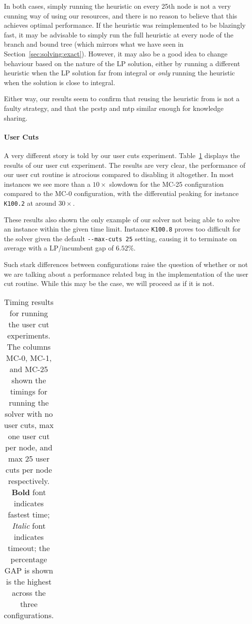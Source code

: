 In both cases, simply running the heuristic on every 25th node is not a very cunning
way of using our resources, and there is no reason to believe that this achieves optimal
performance. If the heuristic was reimplemented to be blazingly fast, it may be advisable to
simply run the full heuristic at every node of the branch and bound tree
(which mirrors what we have seen in Section~\ref{sec:solving:exact}). However, it may also
be a good idea to change behaviour based on the nature of the LP solution, either by
running a different heuristic when the LP solution far from integral or \textit{only}
running the heuristic when the solution is close to integral. 

Either way, our results seem to confirm that reusing the heuristic from
\citeauthor{ljubic2005solving} is not a faulty strategy, and that the \gls{pcstp}
and \gls{mtp} similar enough for knowledge sharing.

\paragraph{User Cuts}
A very different story is told by our user cuts experiment. Table~\ref{tab:jmp:maxcut}
displays the results of our user cut experiment. The results are very clear, the performance
of our user cut routine is atrocious compared to disabling it altogether. In most instances
we see more than a $10 \times$ slowdown for the MC-25 configuration compared to the MC-0
configuration, with the differential peaking for instance \texttt{K100.2} at around $30 \times$.

These results also shown the only example of our solver not being able to solve an instance
within the given time limit. Instance \texttt{K100.8} proves too difficult for the solver
given the default \texttt{-{}-max-cuts 25} setting, causing it to terminate on average with
a LP/incumbent gap of $6.52\%$.

Such stark differences between configurations
raise the question of whether or not we are talking about a performance
related bug in the implementation of the user cut routine.
While this may be the case, we will proceed as if it is not.

\begin{table}[h!]
  \centering
  \begin{tabular}[h!]{|c|c|c|c|c|c|}\hline
    
  \end{tabular}
  \caption{Timing results for running the user cut experiments. The columns MC-0,
    MC-1, and MC-25 shown the timings for running the solver with no user cuts, max
    one user cut per node, and max 25 user cuts per node respectively.
    \textbf{Bold} font indicates fastest time; \textit{Italic} font indicates
    timeout; the percentage GAP is shown is the highest across the three configurations.}\label{tab:jmp:maxcut}
\end{table}

